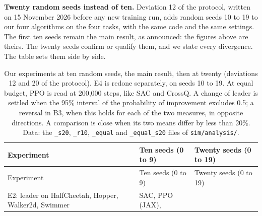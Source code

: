 \documentclass[11pt,a4paper]{article}
\begin{document}
\textbf{Twenty random seeds instead of ten.} Deviation 12 of the
protocol, written on 15 November 2026 before any new training run, adds
random seeds 10 to 19 to our four algorithms on the four tasks, with the
same code and the same settings. The first ten seeds remain the main
result, as announced: the figures above are theirs. The twenty seeds
confirm or qualify them, and we state every divergence. The table sets
them side by side.

\begin{longtable}[]{@{}
  >{\raggedright\arraybackslash}p{}
  >{\raggedright\arraybackslash}p{}
  >{\raggedright\arraybackslash}p{}@{}}
\caption{Our experiments at ten random seeds, the main result, then at
twenty (deviations 12 and 20 of the protocol). E4 is redone separately,
on seeds 10 to 19. At equal budget, PPO is read at 200,000 steps, like
SAC and CrossQ. A change of leader is settled when the 95\% interval of
the probability of improvement excludes 0.5; a reversal in B3, when this
holds for each of the two measures, in opposite directions. A comparison
is close when its two means differ by less than 20\%. Data: the
\texttt{\_s20}, \texttt{\_r10}, \texttt{\_equal} and
\texttt{\_equal\_s20} files of \texttt{sim/analysis/}.}\tabularnewline
\toprule\noalign{}
\begin{minipage}[b]{\linewidth}\raggedright
Experiment
\end{minipage} & \begin{minipage}[b]{\linewidth}\raggedright
Ten seeds (0 to 9)
\end{minipage} & \begin{minipage}[b]{\linewidth}\raggedright
Twenty seeds (0 to 19)
\end{minipage} \\
\midrule\noalign{}
\endfirsthead
\toprule\noalign{}
\begin{minipage}[b]{\linewidth}\raggedright
Experiment
\end{minipage} & \begin{minipage}[b]{\linewidth}\raggedright
Ten seeds (0 to 9)
\end{minipage} & \begin{minipage}[b]{\linewidth}\raggedright
Twenty seeds (0 to 19)
\end{minipage} \\
\midrule\noalign{}
\endhead
\bottomrule\noalign{}
\endlastfoot
E2: leader on HalfCheetah, Hopper, Walker2d, Swimmer & SAC, PPO (JAX),

\end{longtable}
\end{document}
